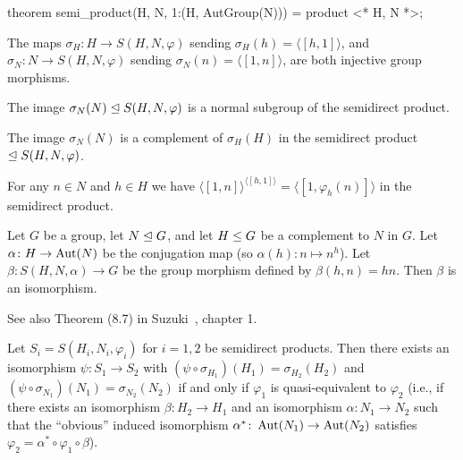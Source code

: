 \begin{mizar}
theorem
  semi_product(H, N, 1:(H, AutGroup(N))) = product <* H, N *>;
\end{mizar}

\begin{theorem}
The maps $\sigma_{H}\colon H\to S(H, N,\varphi)$ 
sending $\sigma_{H}(h)=\langle[h,1]\rangle$, 
and $\sigma_{N}\colon N\to S(H, N, \varphi)$
sending $\sigma_{N}(n)=\langle[1,n]\rangle$,
are both injective group morphisms.
\end{theorem}

\begin{theorem}
The image $\sigma_{N}(N)\trianglelefteq S(H, N, \varphi)$ is a normal
subgroup of the semidirect product.
\end{theorem}

\begin{theorem}
The image $\sigma_{N}(N)$ is a complement of $\sigma_{H}(H)$ in the
semidirect product $\trianglelefteq S(H, N, \varphi)$.
\end{theorem}

\begin{theorem}
For any $n\in N$ and $h\in H$ we have
$\langle[1, n]\rangle^{\langle[h,1]\rangle} = \langle[1, \varphi_{h}(n)]\rangle$ 
in the semidirect product.
\end{theorem}

\begin{theorem}
Let $G$ be a group, let $N\trianglelefteq G$, and let $H\leq G$ be a
complement to $N$ in $G$.
Let $\alpha\colon H\to\operatorname{Aut}(N)$ be the conjugation map (so
$\alpha(h)\colon n\mapsto n^{h}$).
Let $\beta\colon S(H, N, \alpha)\to G$ be the group morphism defined by
$\beta(h,n)=hn$. Then $\beta$ is an isomorphism.
\end{theorem}

\begin{thm-remark}
See also Theorem (8.7) in Suzuki~\cite{suzuki1982group}, chapter 1.
\end{thm-remark}

\begin{theorem}
Let $S_{i}=S(H_{i}, N_{i}, \varphi_{i})$ for $i=1,2$ be semidirect products.
Then there exists an isomorphism $\psi\colon S_{1}\to S_{2}$ with
$(\psi\circ\sigma_{H_{1}})(H_{1})=\sigma_{H_{2}}(H_{2})$ and
$(\psi\circ\sigma_{N_{1}})(N_{1})=\sigma_{N_{2}}(N_{2})$ if and only if
$\varphi_{1}$ is quasi-equivalent to $\varphi_{2}$ (i.e., if there
exists an isomorphism $\beta\colon H_{2}\to H_{1}$ and an isomorphism
$\alpha\colon N_{1}\to N_{2}$ such that the ``obvious'' induced isomorphism
$\alpha^{*}\colon\operatorname{Aut}(N_{1})\to\operatorname{Aut}(N_{2})$
satisfies $\varphi_{2}=\alpha^{*}\circ\varphi_{1}\circ\beta$).
\end{theorem}

